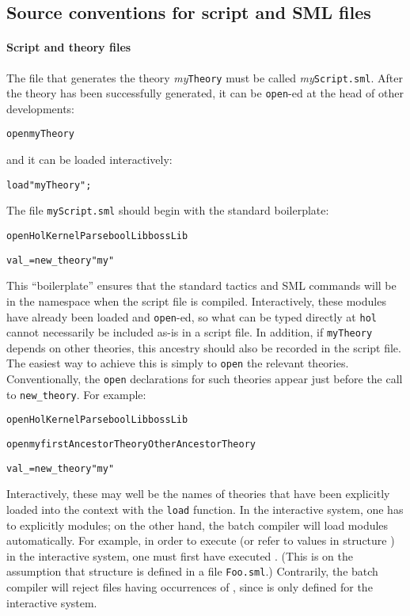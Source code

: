 \subsection{Source conventions for script and SML files}

\paragraph{Script and theory files}
The file that generates the \HOL{} theory \textit{my}\texttt{Theory} must be called \textit{my}\texttt{Script.sml}.
After the theory has been successfully generated, it can be \texttt{open}-ed at the head of other developments:
\begin{alltt}
    open myTheory
\end{alltt}
and it can be loaded interactively:
\begin{alltt}
    load "myTheory";
\end{alltt}
The file \texttt{myScript.sml} should begin with the standard boilerplate:
\begin{alltt}
    open HolKernel Parse boolLib bossLib

    val _ = new_theory "my"
\end{alltt}
This ``boilerplate'' ensures that the standard tactics and SML commands will be in the namespace when the script file is compiled.
Interactively, these modules have already been loaded and \texttt{open}-ed, so what can be typed directly at \texttt{hol} cannot necessarily be included as-is in a script file.
In addition, if \texttt{myTheory} depends on other \HOL{} theories, this ancestry should also be recorded in the script file.
The easiest way to achieve this is simply to \texttt{open} the relevant theories.
Conventionally, the \texttt{open} declarations for such theories appear just before the call to \texttt{new_theory}.
For example:
\begin{alltt}
    open HolKernel Parse boolLib bossLib

    open myfirstAncestorTheory OtherAncestorTheory

    val _ = new_theory "my"
\end{alltt}
Interactively, these may well be the names of theories that have been explicitly loaded into the context with the \texttt{load} function.
In the interactive system, one has to explicitly  modules; on the other hand, the batch compiler will load modules automatically.
For example, in order to execute  (or refer to values in structure ) in the interactive system, one must first have executed .
(This is on the assumption that structure  is defined in a file \texttt{Foo.sml}.)
Contrarily, the batch compiler will reject files having occurrences of , since  is only defined for the interactive system.

